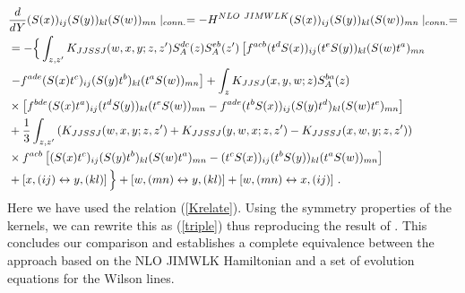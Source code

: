 \documentclass[11pt,a4paper]{article}
\begin{document}
 \begin{equation}\begin{split}
&\frac{d}{dY}(S(x))_{ij}(S(y))_{kl}(S(w))_{mn}\mid_{conn.}=-H^{NLO\ JIMWLK}(S(x))_{ij}(S(y))_{kl}(S(w))_{mn}\mid_{conn.}=\\
&=-\Big\{\int_{z,z^{\prime}}K_{JJSSJ}(w,x,y;z,z^{\prime})S_{A}^{dc}(z)S_{A}^{eb}(z^{\prime})\left[f^{acb}(t^{d}S(x))_{ij}(t^{e}S(y))_{kl}(S(w)t^{a})_{mn}\right.\\
&\left.-f^{ade}(S(x)t^{c})_{ij}(S(y)t^{b})_{kl}(t^{a}S(w))_{mn}\right]
+\int_{z}K_{JJSJ}(x,y,w;z)S_{A}^{ba}(z) \\
&\times  \left[f^{bde}(S(x)t^{a})_{ij}(t^{d}S(y))_{kl}(t^{e}S(w))_{mn}-f^{ade}(t^{b}S(x))_{ij}(S(y)t^{d})_{kl}(S(w)t^{e})_{mn}\right] \\
&+{1\over 3}\int_{z,z^{\prime}}\left(K_{JJSSJ}(w,x,y;z,z^{\prime})+K_{JJSSJ}(y,w,x;z,z^{\prime})-K_{JJSSJ}(x,w,y;z,z^{\prime})\right)\\ 
& \times f^{acb}\left[(S(x)t^{c})_{ij}(S(y)t^{b})_{kl}(S(w)t^{a})_{mn}
 -(t^{c}S(x))_{ij}(t^{b}S(y))_{kl}(t^{a}S(w))_{mn}\right]\\
 &+\left[x,(ij)\leftrightarrow y,(kl)\right]\Big\}+\left[w,(mn)\leftrightarrow y,(kl)\right]+\left[w,(mn)\leftrightarrow x,(ij)\right]\,.
 \end{split}\end{equation}
Here we have used the relation (\ref{Krelate}). Using the symmetry properties of the kernels, we can rewrite this as (\ref{triple})
thus reproducing the result of \cite{BClast}.
This concludes our comparison and establishes a complete equivalence between the approach based on the NLO JIMWLK 
Hamiltonian and a set of evolution equations for the Wilson lines. 
  
\end{document}
